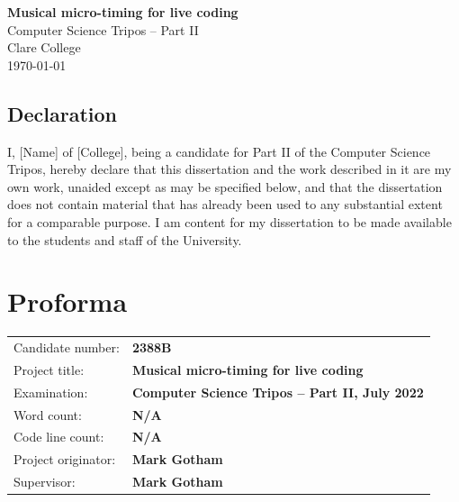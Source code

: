 \documentclass[12pt,twoside,openright]{report}
\begin{document}

\begin{titlepage}
    \pagestyle{empty}


    \vspace*{60mm}
    \begin{center}
    \Huge
    \textbf{Musical micro-timing for live coding} \\[5mm]
    Computer Science Tripos -- Part II \\[5mm]
    Clare College \\[5mm]
    \today
    \end{center}
\end{titlepage}


\pagestyle{plain}

\section*{Declaration}

I, [Name] of [College], being a candidate for Part II of the Computer Science Tripos, hereby declare that this dissertation and the work described in it are my own work, unaided except as may be specified below, and that the dissertation does not contain material that has already been used to any substantial extent for a comparable purpose. I am content for my dissertation to be made available to the students and staff of the University.

\bigskip
{}

\medskip
{}


\newpage
\chapter*{Proforma}

{\large
\begin{tabular}{ll}
Candidate number:   & \bf 2388B \\
Project title:      & \bf Musical micro-timing for live coding \\
Examination:        & \bf Computer Science Tripos -- Part II, July 2022  \\
Word count:         & \bf N/A \\
Code line count:    & \bf N/A \\
Project originator: & \bf Mark Gotham \\
Supervisor:         & \bf Mark Gotham \\
\end{tabular}
}
\end{document}
